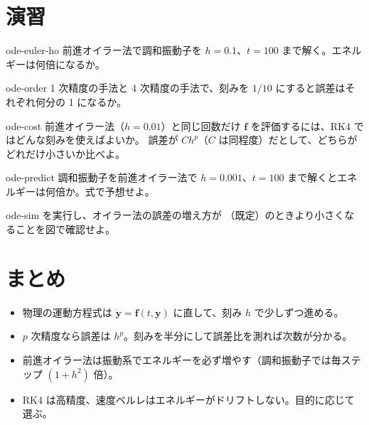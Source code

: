 \section{演習}\label{sec:ode-exercises}

\begin{exercise}[基礎]{ode-euler-ho}
前進オイラー法で調和振動子を $h=0.1$、$t=100$ まで解く。エネルギーは何倍になるか。
\end{exercise}

\begin{exercise}[基礎]{ode-order}
1 次精度の手法と 4 次精度の手法で、刻みを $1/10$ にすると誤差はそれぞれ何分の 1 になるか。
\end{exercise}

\begin{exercise}[応用]{ode-cost}
前進オイラー法（$h=0.01$）と同じ回数だけ $\mathbf f$ を評価するには、RK4 ではどんな刻みを使えばよいか。
誤差が $C h^p$（$C$ は同程度）だとして、どちらがどれだけ小さいか比べよ。
\end{exercise}

\begin{exercise}[予想してから実行]{ode-predict}
調和振動子を前進オイラー法で $h=0.001$、$t=100$ まで解くとエネルギーは何倍か。式で予想せよ。
\end{exercise}

\begin{exercise}[シミュレーション]{ode-sim}
 を実行し、オイラー法の誤差の増え方が
（既定）のときより小さくなることを図で確認せよ。
\end{exercise}

\section{まとめ}\label{sec:ode-summary}

\begin{summary}
\begin{itemize}
  \item 物理の運動方程式は $\dot{\mathbf y}=\mathbf f(t,\mathbf y)$ に直して、刻み $h$ で少しずつ進める。
  \item $p$ 次精度なら誤差は $h^p$。刻みを半分にして誤差比を測れば次数が分かる。
  \item 前進オイラー法は振動系でエネルギーを必ず増やす（調和振動子では毎ステップ $(1+h^2)$ 倍）。
  \item RK4 は高精度、速度ベルレはエネルギーがドリフトしない。目的に応じて選ぶ。
\end{itemize}
\end{summary}

